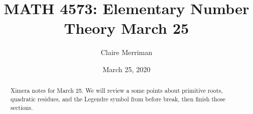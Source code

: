 \documentclass{xourse}
\title{MATH 4573: Elementary Number Theory March 25}
\author{Claire Merriman}
\date{March 25, 2020}
\begin{document}
  
\begin{abstract} %
Ximera notes for March 25. We will review a some points about primitive roots, quadratic residues, and the Legendre symbol from before break, then finish those sections.

\end{abstract}  
\maketitle 
 
 
\end{document}
